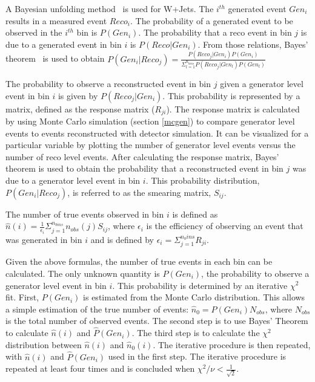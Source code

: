 \documentclass[oneside, letterpaper, oldfontcommands]{memoir}
\begin{document}
\qquad A Bayesian unfolding method~\cite{D'Agostini:1995487} is used for W+Jets. The $i^{th}$ generated event $Gen_{i}$ results in a measured event $Reco_{i}$. The probability of a generated event to be observed in the $i^{th}$ bin is $P(Gen_{i})$. The probability that a reco event in bin $j$ is due to a generated event in bin $i$ is $P(Reco|Gen_{i})$. From those relations, Bayes' theorem~\cite{BevingtonRobinson200207} is used to obtain $P(Gen_{i}|Reco_{j}) = \frac{P(Reco_{j}|Gen_{i})P(Gen_{i})}{\Sigma_{l=1}^{n_{bins}}P(Reco_{j}|Gen_{l})P(Gen_{l})}$

\qquad The probability to observe a reconstructed event in bin $j$ given a generator level event in bin $i$ is given by $P(Reco_{j}|Gen_{i})$. This probability is represented by a matrix, defined as the response matrix ($R_{ji}$). The response matrix is calculated by using Monte Carlo simulation (section \ref{mcgen}) to compare generator level events to events reconstructed with detector simulation. It can be visualized for a particular variable by plotting the number of generator level events versus the number of reco level events. After calculating the response matrix, Bayes' theorem is used to obtain the probability that a reconstructed event in bin $j$ was due to a generator level event in bin $i$. This probability distribution, $P(Gen_{i}|Reco_{j})$, is referred to as the smearing matrix, $S_{ij}$.

\qquad The number of true events observed in bin $i$ is defined as $\hat{n}(i) = \frac{1}{\epsilon_{i}}\Sigma_{j=1}^{n_{bins}}n_{obs}(j)S_{ij}$, where $\epsilon_{i}$ is the efficiency of observing an event that was generated in bin $i$ and is defined by $\epsilon_{i}=\Sigma_{j=1}^{n_bins}R_{ji}$.

\qquad Given the above formulas, the number of true events in each bin can be calculated. The only unknown quantity is $P(Gen_{i})$, the probability to observe a generator level event in bin $i$. This probability is determined by an iterative $\chi^2$ fit. First, $P(Gen_{i})$ is estimated from the Monte Carlo distribution. This allows a simple estimation of the true number of events: $\hat{n}_{0} = P(Gen_{i})N_{obs}$, where $N_{obs}$ is the total number of observed events. The second step is to use Bayes' Theorem to calculate $\hat{n}(i)$ and $\hat{P}(Gen_{i})$. The third step is to calculate the $\chi^{2}$ distribution between $\hat{n}(i)$ and $\hat{n}_{0}(i)$. The iterative procedure is then repeated, with $\hat{n}(i)$ and $\hat{P}(Gen_{i})$ used in the first step. The iterative procedure is repeated at least four times and is concluded when $\chi^{2}/\nu < \frac{1}{\sqrt{2}}$.
\end{document}
